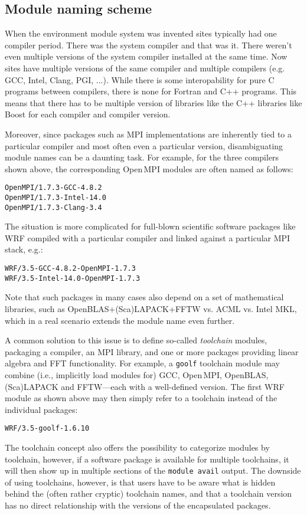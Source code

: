 \subsection{Module naming scheme}
\label{sec:Module_naming_scheme}
When the environment module system was invented sites typically had
one compiler period.  There was the system compiler and that was it.
There weren't even multiple versions of the system compiler installed
at the same time.  Now sites have multiple versions of the same
compiler and multiple compilers (e.g. GCC, Intel, Clang, PGI, ...).
While there is some interopability for pure C programs between
compilers, there is none for Fortran and C++ programs.  This means
that there has to be multiple version of libraries like the C++
libraries like Boost for each compiler and compiler version. 

Moreover, since packages such as MPI implementations are inherently tied to a
particular compiler and most often even a particular version, disambiguating
module names can be a daunting task. For example, for the three compilers
shown above, the corresponding Open\,MPI modules are often named as follows:
{\small
\begin{alltt}
    OpenMPI/1.7.3-GCC-4.8.2
    OpenMPI/1.7.3-Intel-14.0
    OpenMPI/1.7.3-Clang-3.4
\end{alltt}
}

The situation is more complicated for full-blown scientific software
packages like WRF compiled with a particular compiler and linked
against a particular MPI stack, e.g.:
{\small
\begin{alltt}
    WRF/3.5-GCC-4.8.2-OpenMPI-1.7.3
    WRF/3.5-Intel-14.0-OpenMPI-1.7.3
\end{alltt}
}
\noindent
Note that such packages in many cases also depend on a set of mathematical
libraries, such as OpenBLAS+(Sca)LAPACK+FFTW vs. ACML vs. Intel MKL, which in a
real scenario extends the module name even further.

A common solution to this issue is to define so-called \emph{toolchain}
modules, packaging a compiler, an MPI library, and one or more packages
providing linear algebra and FFT functionality. For example, a \texttt{goolf}
toolchain module may combine (i.e., implicitly load modules for) GCC,
Open\,MPI, OpenBLAS, (Sca)LAPACK and FFTW---each with a well-defined version. The
first WRF module as shown above may then simply refer to a toolchain instead of the
individual packages:
{\small
\begin{alltt}
    WRF/3.5-goolf-1.6.10
\end{alltt}
}
The toolchain concept also offers the possibility to categorize modules by
toolchain, however, if a software package is available for multiple
toolchains, it will then show up in multiple sections of the \texttt{module
avail} output. The downside of using toolchains, however, is that users have
to be aware what is hidden behind the (often rather cryptic) toolchain names,
and that a toolchain version has no direct relationship with the versions of
the encapsulated packages.

